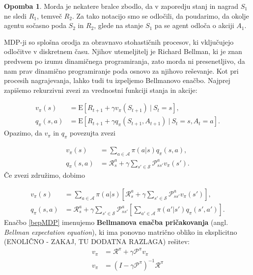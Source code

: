 \documentclass[12pt,a4paper]{amsart}
\theoremstyle{definition} %
\newtheorem{opomba}[definicija]{Opomba}
\theoremstyle{plain} %
\begin{document}
\begin{opomba}
    Morda je nekatere bralce zbodlo, da v zaporedju stanj in nagrad $S_1$ ne sledi $R_1$, temveč 
    $R_2$. Za tako notacijo smo se odločili, da poudarimo, da okolje agentu sočasno poda $S_2$ in 
    $R_2$, glede na stanje $S_1$ pa se agent odloča o akciji $A_1$.
\end{opomba}

MDP-ji so splošna orodja za obravnavo stohastičnih procesov, ki vključujejo odločitve v diskretnem 
času. Njihov utemeljitelj je Richard Bellman, ki je znan predvsem po izumu dinamičnega 
programiranja, zato morda ni presenetljivo, da nam prav dinamično programiranje poda osnovo za 
njihovo reševanje.
Kot pri procesih nagrajevanja, lahko tudi tu izpeljemo Bellmanovo enačbo. Najprej zapišemo 
rekurzivni zvezi za vrednostni funkciji stanja in akcije: 

\begin{align*}
    v_\pi(s) &= \mathrm{E} [R_{t+1} + \gamma v_\pi(S_{t+1})~|~S_t = s], \\
    q_\pi(s, a) &= \mathrm{E} [R_{t+1} + \gamma q_\pi(S_{t+1}, A_{t+1})~|~S_t = s, A_t = a].
\end{align*}
Opazimo, da $v_\pi$ in $q_\pi$ povezujta zvezi

\begin{align*}
    v_\pi(s) &= \sum_{a \in \mathcal{A}} \pi(a|s)q_\pi(s, a), \\
    q_\pi(s, a) &= \mathcal{R}_s^a + \gamma \sum_{s' \in \mathcal{S}} \mathcal{P}_{ss'}^a v_\pi(s').
\end{align*}
Če zvezi združimo, dobimo

\begin{align}
    v_\pi(s) &= \sum_{a \in \mathcal{A}} \pi(a|s) \left[\mathcal{R}_s^a + 
    \gamma \sum_{s' \in \mathcal{S}} \mathcal{P}_{ss'}^a v_\pi(s') \right], \label{bepMDP} \\
    q_\pi(s, a) &= \mathcal{R}_s^a + \gamma \sum_{s' \in \mathcal{S}} 
    \mathcal{P}_{ss'}^a \left[\sum_{a' \in \mathcal{A}} \pi(a'|s')q_\pi(s', a') \right].
\end{align}
Enačbo \eqref{bepMDP} imenujemo \textbf{Bellmanova enačba pričakovanja} (angl. \textit{Bellman 
expectation equation}), ki ima ponovno matrično obliko in eksplicitno (ENOLIČNO - ZAKAJ, TU 
DODATNA RAZLAGA) rešitev: 
\begin{align*}
    v_\pi &= \mathcal{R}^\pi + \gamma \mathcal{P}^\pi v_\pi \\
    v_\pi &= (I - \gamma \mathcal{P}^\pi)^{-1} \mathcal{R}^\pi
\end{align*}
\end{document}

